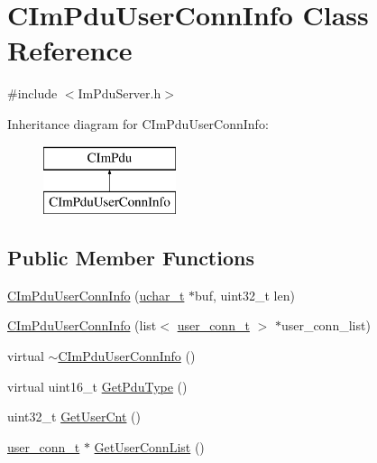 \hypertarget{class_c_im_pdu_user_conn_info}{}\section{C\+Im\+Pdu\+User\+Conn\+Info Class Reference}
\label{class_c_im_pdu_user_conn_info}


{\ttfamily \#include $<$Im\+Pdu\+Server.\+h$>$}

Inheritance diagram for C\+Im\+Pdu\+User\+Conn\+Info\+:\begin{figure}[H]
\begin{center}
\leavevmode
\includegraphics[height=2.000000cm]{class_c_im_pdu_user_conn_info}
\end{center}
\end{figure}
\subsection*{Public Member Functions}
\begin{DoxyCompactItemize}
\item 
\hyperlink{class_c_im_pdu_user_conn_info_a9d787e8263147952498a7766e666cf80}{C\+Im\+Pdu\+User\+Conn\+Info} (\hyperlink{base_2ostype_8h_a124ea0f8f4a23a0a286b5582137f0b8d}{uchar\+\_\+t} $\ast$buf, uint32\+\_\+t len)
\item 
\hyperlink{class_c_im_pdu_user_conn_info_a976af5c7e429dd10199eb4e933c69de3}{C\+Im\+Pdu\+User\+Conn\+Info} (list$<$ \hyperlink{structuser__conn__t}{user\+\_\+conn\+\_\+t} $>$ $\ast$user\+\_\+conn\+\_\+list)
\item 
virtual \hyperlink{class_c_im_pdu_user_conn_info_a89d4916a0d5fc637be09cb0675599d38}{$\sim$\+C\+Im\+Pdu\+User\+Conn\+Info} ()
\item 
virtual uint16\+\_\+t \hyperlink{class_c_im_pdu_user_conn_info_af86b2f2af2b4295661651271fc01d690}{Get\+Pdu\+Type} ()
\item 
uint32\+\_\+t \hyperlink{class_c_im_pdu_user_conn_info_aec302ec611809424bd3bcca46fce2aef}{Get\+User\+Cnt} ()
\item 
\hyperlink{structuser__conn__t}{user\+\_\+conn\+\_\+t} $\ast$ \hyperlink{class_c_im_pdu_user_conn_info_a51eb1430b262eff8570060e74af21366}{Get\+User\+Conn\+List} ()
\end{DoxyCompactItemize}
